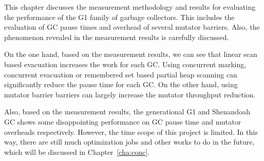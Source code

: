 This chapter discusses the measurement methodology and results for evaluating the
performance of the G1 family of garbage collectors. This includes the evaluation of
GC pause times and overhead of several mutator barriers. Also, the phenomenon revealed
in the measurement results is carefully discussed.

On the one hand, based on the measurement results, we can see that linear scan based evacuation
increases the work for each GC. Using concurrent marking, concurrent evacuation
or remembered set based partial heap scanning can significantly reduce the pause time
for each GC. On the other hand, using mutator barrier barriers can largely increase the
mutator throughput reduction.

Also, based on the measurement results, the generational G1 and Shenandoah GC shows some
disappointing performance on GC pause time and mutator overheads respectively.
However, the time scope of this project is limited.
In this way, there are still much optimization jobs and other works to do in the future,
which will be discussed in Chapter~\ref{cha:conc}.







%   

%       

%       

